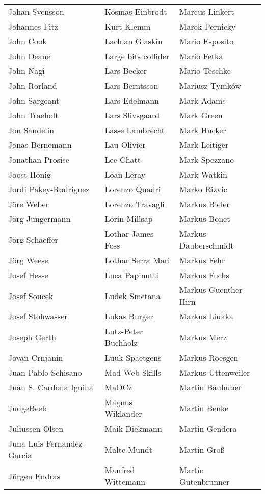 \begin{tabular}{p{4.5cm}p{4.5cm}p{4.5cm}}
Johan Svensson & Kosmas Einbrodt & Marcus Linkert \\
Johannes Fitz & Kurt Klemm & Marek Pernicky \\
John Cook & Lachlan Glaskin & Mario Esposito \\
John Deane & Large bits collider & Mario Fetka \\
John Nagi & Lars Becker & Mario Teschke \\
John Rorland & Lars Berntsson & Mariusz Tymków \\
John Sargeant & Lars Edelmann & Mark Adams \\
John Traeholt & Lars Slivsgaard & Mark Green \\
Jon Sandelin & Lasse Lambrecht & Mark Hucker \\
Jonas Bernemann & Lau Olivier & Mark Leitiger \\
Jonathan Prosise & Lee Chatt & Mark Spezzano \\
Joost Honig & Loan Leray & Mark Watkin \\
Jordi Pakey-Rodriguez & Lorenzo Quadri & Marko Rizvic \\
Jöre Weber & Lorenzo Travagli & Markus Bieler \\
Jörg Jungermann & Lorin Millsap & Markus Bonet \\
Jörg Schaeffer & Lothar James Foss & Markus Dauberschmidt \\
Jörg Weese & Lothar Serra Mari & Markus Fehr \\
Josef Hesse & Luca Papinutti & Markus Fuchs \\
Josef Soucek & Ludek Smetana & Markus Guenther-Hirn \\
Josef Stohwasser & Lukas Burger & Markus Liukka \\
Joseph Gerth & Lutz-Peter Buchholz & Markus Merz \\
Jovan Crnjanin & Luuk Spaetgens & Markus Roesgen \\
Juan Pablo Schisano & Mad Web Skills & Markus Uttenweiler \\
Juan S. Cardona Iguina & MaDCz & Martin Bauhuber \\
JudgeBeeb & Magnus Wiklander & Martin Benke \\
Juliussen Olsen & Maik Diekmann & Martin Gendera \\
Juna Luis Fernandez Garcia & Malte Mundt & Martin Groß \\
Jürgen Endras & Manfred Wittemann & Martin Gutenbrunner \\

\end{tabular}
